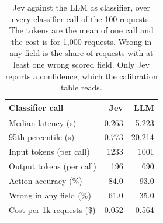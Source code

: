 \begin{table}[t]
\caption{Jev against the LLM as classifier, over every classifier call of the 100 requests. The tokens are the mean of one call and the cost is for 1,000 requests. Wrong in any field is the share of requests with at least one wrong scored field. Only Jev reports a confidence, which the calibration table reads.}
\label{tab:stage}
\small
\begin{tabular}{lrr}
\toprule
Classifier call & Jev & LLM \\
\midrule
Median latency (s) & 0.263 & 5.223 \\
95th percentile (s) & 0.773 & 20.214 \\
Input tokens (per call) & 1233 & 1001 \\
Output tokens (per call) & 196 & 690 \\
Action accuracy (\%) & 84.0 & 93.0 \\
Wrong in any field (\%) & 61.0 & 35.0 \\
Cost per 1k requests (\$) & 0.052 & 0.564 \\
\bottomrule
\end{tabular}
\end{table}

